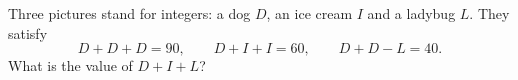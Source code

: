 Three pictures stand for integers: a dog $D$, an ice cream $I$ and a ladybug $L$. They satisfy
\[D+D+D=90,\qquad D+I+I=60,\qquad D+D-L=40.\]
What is the value of $D+I+L$?
